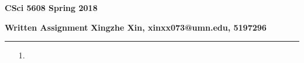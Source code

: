 \documentclass[12pt]{article}
\begin{document}
\begin{center}
{\Large \bf CSci 5608 Spring 2018}
\end{center}
\medskip
{\bf Written Assignment}
\hfill
{\bf Xingzhe Xin, xinxx073@umn.edu, 5197296}
\hrule
\medskip
\begin{enumerate}
    \item[1.] 
\end{enumerate}
\end{document}
